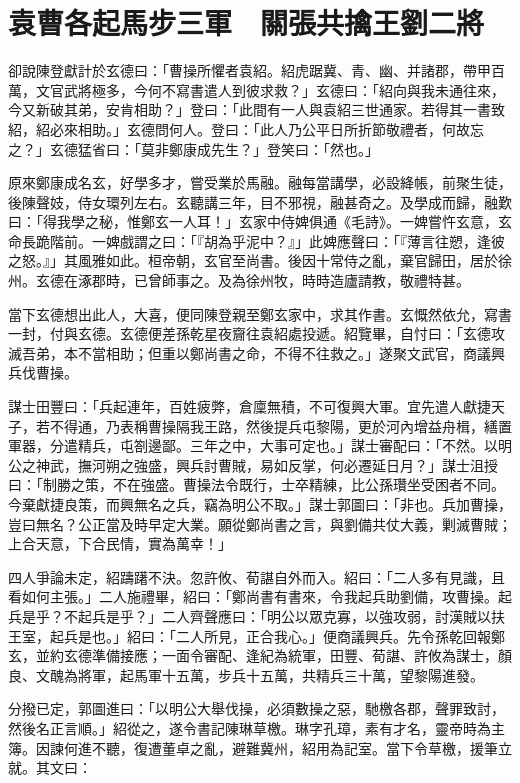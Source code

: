 
\chapter{袁曹各起馬步三軍　關張共擒王劉二將}

卻說陳登獻計於玄德曰：「曹操所懼者袁紹。紹虎踞冀、青、幽、并諸郡，帶甲百萬，文官武將極多，今何不寫書遣人到彼求救？」玄德曰：「紹向與我未通往來，今又新破其弟，安肯相助？」登曰：「此間有一人與袁紹三世通家。若得其一書致紹，紹必來相助。」玄德問何人。登曰：「此人乃公平日所折節敬禮者，何故忘之？」玄德猛省曰：「莫非鄭康成先生？」登笑曰：「然也。」

原來鄭康成名玄，好學多才，嘗受業於馬融。融每當講學，必設絳帳，前聚生徒，後陳聲妓，侍女環列左右。玄聽講三年，目不邪視，融甚奇之。及學成而歸，融歎曰：「得我學之秘，惟鄭玄一人耳！」玄家中侍婢俱通《毛詩》。一婢嘗忤玄意，玄命長跪階前。一婢戲謂之曰：「『胡為乎泥中？』」此婢應聲曰：「『薄言往愬，逢彼之怒。』」其風雅如此。桓帝朝，玄官至尚書。後因十常侍之亂，棄官歸田，居於徐州。玄德在涿郡時，已曾師事之。及為徐州牧，時時造廬請教，敬禮特甚。

當下玄德想出此人，大喜，便同陳登親至鄭玄家中，求其作書。玄慨然依允，寫書一封，付與玄德。玄德便差孫乾星夜齎往袁紹處投遞。紹覽畢，自忖曰：「玄德攻滅吾弟，本不當相助；但重以鄭尚書之命，不得不往救之。」遂聚文武官，商議興兵伐曹操。

謀士田豐曰：「兵起連年，百姓疲弊，倉廩無積，不可復興大軍。宜先遣人獻捷天子，若不得通，乃表稱曹操隔我王路，然後提兵屯黎陽，更於河內增益舟楫，繕置軍器，分遣精兵，屯劄邊鄙。三年之中，大事可定也。」謀士審配曰：「不然。以明公之神武，撫河朔之強盛，興兵討曹賊，易如反掌，何必遷延日月？」謀士沮授曰：「制勝之策，不在強盛。曹操法令既行，士卒精練，比公孫瓚坐受困者不同。今棄獻捷良策，而興無名之兵，竊為明公不取。」謀士郭圖曰：「非也。兵加曹操，豈曰無名？公正當及時早定大業。願從鄭尚書之言，與劉備共仗大義，剿滅曹賊；上合天意，下合民情，實為萬幸！」

四人爭論未定，紹躊躇不決。忽許攸、荀諶自外而入。紹曰：「二人多有見識，且看如何主張。」二人施禮畢，紹曰：「鄭尚書有書來，令我起兵助劉備，攻曹操。起兵是乎？不起兵是乎？」二人齊聲應曰：「明公以眾克寡，以強攻弱，討漢賊以扶王室，起兵是也。」紹曰：「二人所見，正合我心。」便商議興兵。先令孫乾回報鄭玄，並約玄德準備接應；一面令審配、逢紀為統軍，田豐、荀諶、許攸為謀士，顏良、文醜為將軍，起馬軍十五萬，步兵十五萬，共精兵三十萬，望黎陽進發。

分撥已定，郭圖進曰：「以明公大舉伐操，必須數操之惡，馳檄各郡，聲罪致討，然後名正言順。」紹從之，遂令書記陳琳草檄。琳字孔璋，素有才名，靈帝時為主簿。因諫何進不聽，復遭董卓之亂，避難冀州，紹用為記室。當下令草檄，援筆立就。其文曰：

